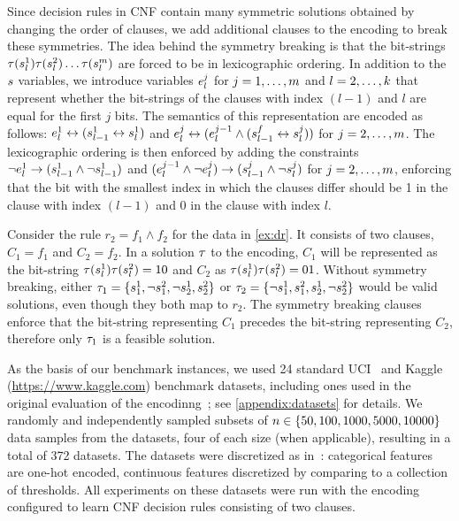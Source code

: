 Since decision rules in CNF contain many symmetric solutions obtained by changing the order of clauses, we add additional clauses to the encoding to break these symmetries.
The idea behind the symmetry breaking is that the bit-strings $\tau(s_l^1)\tau(s_l^2)\dots\tau(s_l^m)$ are forced to be in lexicographic ordering.
In addition to the $s$ variables, we introduce variables $e_l^j$ for $j=1,\dots,m$ and $l=2,\dots,k$ that represent whether the bit-strings of the clauses with index $(l-1)$ and $l$ are equal for the first $j$ bits.
The semantics of this representation are encoded as follows:
$e_l^1 \leftrightarrow (s_{l-1}^1 \leftrightarrow s_l^1)$ and $e_l^j \leftrightarrow (e_l^{j-1} \land (s_{l-1}^f \leftrightarrow s_l^j))$ for $j=2,\dots,m$.
The lexicographic ordering is then enforced by adding the constraints $\lnot e_l^1 \rightarrow (s_{l-1}^1 \land \lnot s_{l-1}^1)$ and $(e_l^{j-1} \land \lnot e_l^j) \rightarrow (s_{l-1}^j \land \lnot s_l^j)$ for $j=2,\dots,m$, enforcing that the bit with the smallest index in which the clauses differ should be 1 in the clause with index $(l-1)$ and 0 in the clause with index $l$.

\begin{example}
  Consider the rule $r_2 = f_1 \land f_2$ for the data in \cref{ex:dr}.
  It consists of two clauses, $C_1 = f_1$ and $C_2 = f_2$.
  In a solution $\tau$ to the encoding, $C_1$ will be represented as the bit-string $\tau(s_l^1)\tau(s_l^2)=10$ and $C_2$ as $\tau(s_l^1)\tau(s_l^2)=01$.
  Without symmetry breaking, either $\tau_1 = \{s_1^1, \lnot s_1^2, \lnot s_2^1, s_2^2\}$ or $\tau_2 = \{\lnot s_1^1, s_1^2, s_2^1, \lnot s_2^2\}$ would be valid solutions, even though they both map to $r_2$.
  The symmetry breaking clauses enforce that the bit-string representing $C_1$ precedes the bit-string representing $C_2$, therefore only $\tau_1$ is a feasible solution.
\end{example}

As the basis of our benchmark instances, we used 24 standard UCI~\autocite{UciMlr} and Kaggle ({\small\url{https://www.kaggle.com}}) benchmark datasets, including ones used in the original evaluation of the encodinng~\autocite{DBLP:conf/cp/MaliotovM18}; see \cref{appendix:datasets} for details.
We randomly and independently sampled subsets of $n\in\{50,100,1000,5000,10000\}$ data samples from the datasets, four of each size (when applicable), resulting in a total of 372 datasets.
The datasets were discretized as in~\autocite{DBLP:conf/cp/MaliotovM18}:
categorical features are one-hot encoded, continuous features discretized by comparing to a collection of thresholds.
All experiments on these datasets were run with the encoding configured to learn CNF decision rules consisting of two clauses.


